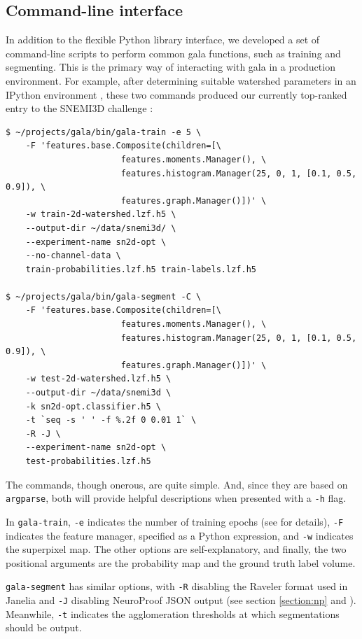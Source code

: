 \documentclass{frontiersSCNS} %
\begin{document}
\subsection{Command-line interface}

In addition to the flexible Python library interface, we developed a set of command-line scripts to perform common gala functions, such as training and segmenting.
This is the primary way of interacting with gala in a production environment.
For example, after determining suitable watershed parameters in an IPython environment \citep{Perez:2007}, these two commands produced our currently top-ranked entry to the SNEMI3D challenge \citep{snemi}:

{\small
\begin{verbatim}
$ ~/projects/gala/bin/gala-train -e 5 \
    -F 'features.base.Composite(children=[\
                       features.moments.Manager(), \
                       features.histogram.Manager(25, 0, 1, [0.1, 0.5, 0.9]), \
                       features.graph.Manager()])' \
    -w train-2d-watershed.lzf.h5 \
    --output-dir ~/data/snemi3d/ \
    --experiment-name sn2d-opt \
    --no-channel-data \
    train-probabilities.lzf.h5 train-labels.lzf.h5 

$ ~/projects/gala/bin/gala-segment -C \
    -F 'features.base.Composite(children=[\
                       features.moments.Manager(), \
                       features.histogram.Manager(25, 0, 1, [0.1, 0.5, 0.9]), \
                       features.graph.Manager()])' \
    -w test-2d-watershed.lzf.h5 \
    --output-dir ~/data/snemi3d \
    -k sn2d-opt.classifier.h5 \
    -t `seq -s ' ' -f %.2f 0 0.01 1` \
    -R -J \
    --experiment-name sn2d-opt \
    test-probabilities.lzf.h5
\end{verbatim}
}

The commands, though onerous, are quite simple.
And, since they are based on \texttt{\small argparse}, both will provide helpful descriptions when presented with a \texttt{\small -h} flag.

In \texttt{\small gala-train}, \texttt{\small -e} indicates the number of training epochs (see \cite{NunezIglesias:2013cd} for details), \texttt{\small -F} indicates the feature manager, specified as a Python expression, and \texttt{\small -w} indicates the superpixel map.
The other options are self-explanatory, and finally, the two positional arguments are the probability map and the ground truth label volume.

\texttt{\small gala-segment} has similar options, with \texttt{\small -R} disabling the Raveler format \citep{raveler} used in Janelia and \texttt{\small -J} disabling NeuroProof JSON output (see section \ref{section:np} and \cite{np}).
Meanwhile, \texttt{\small -t} indicates the agglomeration thresholds at which segmentations should be output.
\end{document}
